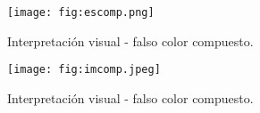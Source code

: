 \begin{frame}{}
  \begin{figure}
    \centering
    \texttt{[image: fig:escomp.png]}
    \caption{Interpretación visual - falso color compuesto.}
    \label{}
  \end{figure}
\end{frame}


\begin{frame}{}
  \begin{figure}
    \centering
    \texttt{[image: fig:imcomp.jpeg]}
    \caption{Interpretación visual - falso color compuesto.}
    \label{}
  \end{figure}
\end{frame}

\gracias
